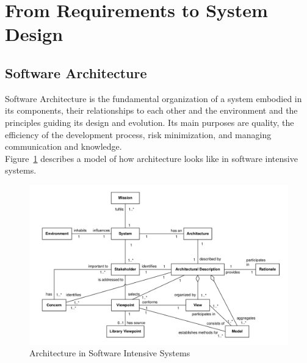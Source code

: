 
\section{From Requirements to System Design}
\subsection{Software Architecture}
Software Architecture is the fundamental organization of a system embodied in its components, their relationships to each other and the environment and the principles guiding its design and evolution.
Its main purposes are quality, the efficiency of the development process, risk minimization, and managing communication and knowledge.\\
Figure~\ref{fig:software_intensive_system_architecture} describes a model of how architecture looks like in software intensive systems.
\begin{figure}[H]
  \centering
  \includegraphics[width=.8\textwidth]{images/software_intensive_system_architecture.png}
  \caption{Architecture in Software Intensive Systems}\label{fig:software_intensive_system_architecture}
\end{figure}

